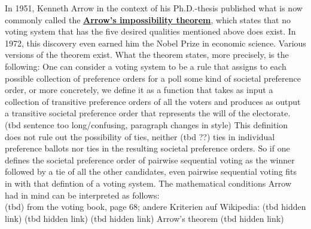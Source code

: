 In 1951, Kenneth Arrow in the context of his Ph.D.-thesis published what is now commonly called the
\href{https://en.wikipedia.org/wiki/Arrow%27s_impossibility_theorem}{\textbf{Arrow's impossibility theorem}}, 
which states that no voting system that has the five desired qualities mentioned above does exist. In 1972, this discovery even earned him the Nobel Prize in economic science. Various versions of the theorem exist. What the theorem states, more precisely, is the following: One can consider a voting system to be a rule that assigns to each possible collection of preference orders for a poll some kind of societal preference order, or more concretely, we define it as a function that takes as input a collection of transitive preference orders of all the voters and produces as output a transitive societal preference order that represents the will of the electorate. (tbd sentence too long/confusing, paragraph changes in style) This definition does not rule out the possibility of ties, neither (tbd ??) ties in individual preference ballots nor ties in the resulting societal preference orders. So if one defines the societal preference order of pairwise sequential voting as the winner followed by a tie of all the other candidates, even pairwise sequential voting fits in with that defintion of a voting system.
The mathematical conditions Arrow had in mind can be interpreted as follows: \\

(tbd)
	from the voting book, page 68; 
	andere Kriterien auf Wikipedia:  
	(tbd hidden link)%
	(tbd hidden link)%
	(tbd hidden link)%
Arrow's theorem	(tbd hidden link)%

